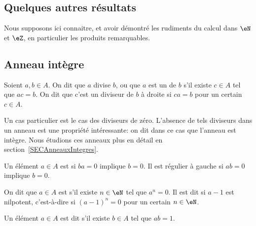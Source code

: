 \subsection{Quelques autres résultats}

Nous supposons ici connaitre, et avoir démontré les rudiments du calcul dans \( \eN\) et \( \eZ\), en particulier les produits remarquables.


\subsection{Anneau intègre}

\begin{definition}\label{DiviseursAnneau}
	Soient \( a, b \in A \). On dit que $a$ divise $b$, ou que $a$ est un  de $b$ s'il existe \( c \in A \) tel que \( ac = b \). On dit que c'est un diviseur de $b$ à droite si \( ca = b \) pour un certain \( c \in A \).
\end{definition}
Un cas particulier est le cas des diviseurs de zéro. L'absence de tels diviseurs dans un anneau est une propriété intéressante: on dit dans ce cas que l'anneau est intègre. Nous étudions ces anneaux plus en détail en section~\ref{SECAnneauxIntegres}.

Un élément \( a\in A\) est  si \( ba=0\) implique \( b=0\). Il est régulier à gauche si \( ab=0\) implique \( b=0\).

\begin{definition}
	On dit que \( a \in A \) est  s'il existe \( n \in \eN \) tel que \( a^n = 0 \). Il est dit  si \( a-1\) est nilpotent, c'est-à-dire si \( (a-1)^n =0\) pour un certain \( n \in \eN \).

	Un élément \( a \in A \) est dit  s'il existe \( b \in A \) tel que \( ab = 1 \).
\end{definition}

